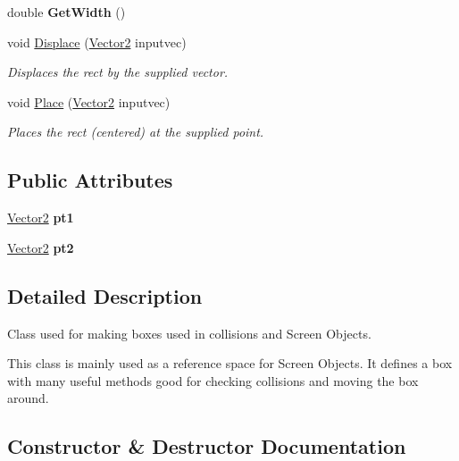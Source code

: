 \begin{DoxyCompactItemize}
\hypertarget{class_rect_a193f7f6cfb2a58c7b66e1143d1ddeb10}{}\label{class_rect_a193f7f6cfb2a58c7b66e1143d1ddeb10} 
double {\bfseries Get\+Width} ()
\item 
\hypertarget{class_rect_a098ae9f097da18fb509f873305d066ed}{}\label{class_rect_a098ae9f097da18fb509f873305d066ed} 
void \hyperlink{class_rect_a098ae9f097da18fb509f873305d066ed}{Displace} (\hyperlink{class_vector2}{Vector2} inputvec)
\begin{DoxyCompactList}\small\item\em Displaces the rect by the supplied vector. \end{DoxyCompactList}\item 
\hypertarget{class_rect_a8d32f2a6333f11f6c415823dd352f631}{}\label{class_rect_a8d32f2a6333f11f6c415823dd352f631} 
void \hyperlink{class_rect_a8d32f2a6333f11f6c415823dd352f631}{Place} (\hyperlink{class_vector2}{Vector2} inputvec)
\begin{DoxyCompactList}\small\item\em Places the rect (centered) at the supplied point. \end{DoxyCompactList}\end{DoxyCompactItemize}
\subsection*{Public Attributes}
\begin{DoxyCompactItemize}
\item 
\hypertarget{class_rect_a6ce67f181f04d552c5b618e47b282a80}{}\label{class_rect_a6ce67f181f04d552c5b618e47b282a80} 
\hyperlink{class_vector2}{Vector2} {\bfseries pt1}
\item 
\hypertarget{class_rect_a691c7827e063156b2cefbb1f2d74b6f5}{}\label{class_rect_a691c7827e063156b2cefbb1f2d74b6f5} 
\hyperlink{class_vector2}{Vector2} {\bfseries pt2}
\end{DoxyCompactItemize}


\subsection{Detailed Description}
Class used for making boxes used in collisions and Screen Objects. 

This class is mainly used as a reference space for Screen Objects. It defines a box with many useful methods good for checking collisions and moving the box around. 

\subsection{Constructor \& Destructor Documentation}
\hypertarget{class_rect_ad24b6cae9dd49da138e054b7b7b5ac3f}{}\label{class_rect_ad24b6cae9dd49da138e054b7b7b5ac3f} 
